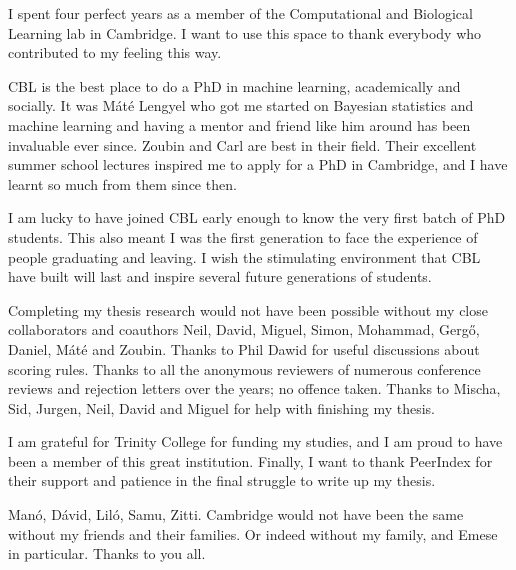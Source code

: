 \begin{acknowledgements}

I spent four perfect years as a member of the Computational and Biological Learning lab in Cambridge. I want to use this space to thank everybody who contributed to my feeling this way.

CBL is the best place to do a PhD in machine learning, academically and socially. It was M\'{a}t\'{e} Lengyel who got me started on Bayesian statistics and machine learning and having a mentor and friend like him around has been invaluable ever since. Zoubin and Carl are best in their field. Their excellent summer school lectures inspired me to apply for a PhD in Cambridge, and I have learnt so much from them since then.

I am lucky to have joined CBL early enough to know the very first batch of PhD students. This also meant I was the first generation to face the experience of people graduating and leaving. I wish the stimulating environment that CBL have built will last and inspire several future generations of students.

Completing my thesis research would not have been possible without my close collaborators and coauthors Neil, David, Miguel, Simon, Mohammad, Gerg\H{o}, Daniel, M\'{a}t\'{e} and Zoubin. Thanks to Phil Dawid for useful discussions about scoring rules. Thanks to all the anonymous reviewers of numerous conference reviews and rejection letters over the years; no offence taken. Thanks to Mischa, Sid, Jurgen, Neil, David and Miguel for help with finishing my thesis. 

I am grateful for Trinity College for funding my studies, and I am proud to have been a member of this great institution. Finally, I want to thank PeerIndex for their support and patience in the final struggle to write up my thesis.

Man\'{o}, D\'{a}vid, Lil\'{o}, Samu, Zitti. Cambridge would not have been the same without my friends and their families. Or indeed without my family, and Emese in particular. Thanks to you all.

\end{acknowledgements}